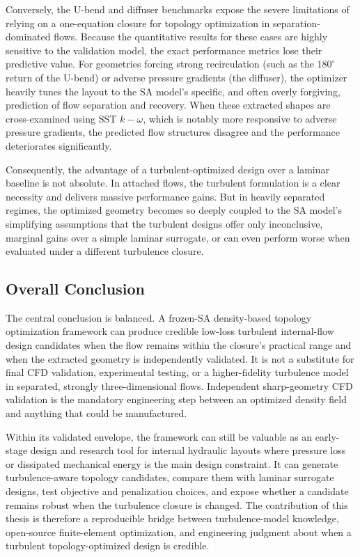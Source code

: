 Conversely, the U-bend and diffuser benchmarks expose the severe limitations of relying on a one-equation closure for topology optimization in separation-dominated flows. Because the quantitative results for these cases are highly sensitive to the validation model, the exact performance metrics lose their predictive value. For geometries forcing strong recirculation (such as the $180^\circ$ return of the U-bend) or adverse pressure gradients (the diffuser), the optimizer heavily tunes the layout to the SA model's specific, and often overly forgiving, prediction of flow separation and recovery. When these extracted shapes are cross-examined using SST $k-\omega$, which is notably more responsive to adverse pressure gradients, the predicted flow structures disagree and the performance deteriorates significantly.

Consequently, the advantage of a turbulent-optimized design over a laminar baseline is not absolute. In attached flows, the turbulent formulation is a clear necessity and delivers massive performance gains. But in heavily separated regimes, the optimized geometry becomes so deeply coupled to the SA model's simplifying assumptions that the turbulent designs offer only inconclusive, marginal gains over a simple laminar surrogate, or can even perform worse when evaluated under a different turbulence closure.

\subsection*{Overall Conclusion}
The central conclusion is balanced. A frozen-SA density-based topology optimization framework can produce credible low-loss turbulent internal-flow design candidates when the flow remains within the closure's practical range and when the extracted geometry is independently validated. It is not a substitute for final CFD validation, experimental testing, or a higher-fidelity turbulence model in separated, strongly three-dimensional flows. Independent sharp-geometry CFD validation is the mandatory engineering step between an optimized density field and anything that could be manufactured.

Within its validated envelope, the framework can still be valuable as an early-stage design and research tool for internal hydraulic layouts where pressure loss or dissipated mechanical energy is the main design constraint. It can generate turbulence-aware topology candidates, compare them with laminar surrogate designs, test objective and penalization choices, and expose whether a candidate remains robust when the turbulence closure is changed. The contribution of this thesis is therefore a reproducible bridge between turbulence-model knowledge, open-source finite-element optimization, and engineering judgment about when a turbulent topology-optimized design is credible.

